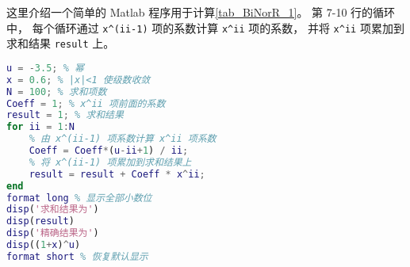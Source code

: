 
这里介绍一个简单的 Matlab 程序用于计算\autoref{tab_BiNorR_1}。 第 7-10 行的循环中， 每个循环通过 \verb|x^(ii-1)| 项的系数计算 \verb|x^ii| 项的系数， 并将 \verb|x^ii| 项累加到求和结果 \verb|result| 上。

\begin{lstlisting}[language=matlab, caption=binorR.m]
% 验证二项式定理(非整数幂)
u = -3.5; % 幂
x = 0.6; % |x|<1 使级数收敛
N = 100; % 求和项数
Coeff = 1; % x^ii 项前面的系数
result = 1; % 求和结果
for ii = 1:N
    % 由 x^(ii-1) 项系数计算 x^ii 项系数
    Coeff = Coeff*(u-ii+1) / ii; 
    % 将 x^(ii-1) 项累加到求和结果上
    result = result + Coeff * x^ii; 
end
format long % 显示全部小数位
disp('求和结果为')
disp(result)
disp('精确结果为')
disp((1+x)^u)
format short % 恢复默认显示
\end{lstlisting}
